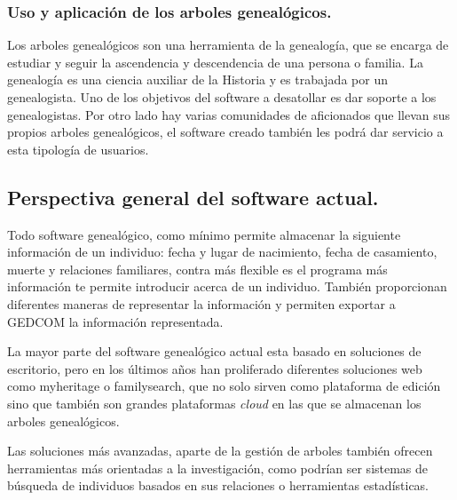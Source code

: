\documentclass[12pt]{article} %
\begin{document}
\subsubsection{Uso y aplicación de los arboles genealógicos.}
Los arboles genealógicos son una herramienta de la genealogía, que se encarga de estudiar y seguir la ascendencia y descendencia de una persona o familia. La genealogía es una ciencia auxiliar de la Historia y es trabajada por un genealogista. Uno de los objetivos del software a desatollar es dar soporte a los genealogistas. \linebreak Por otro lado hay varias comunidades de aficionados que llevan sus propios arboles genealógicos, el software creado también les podrá dar servicio a esta tipología de usuarios.

\newpage
\subsection{Perspectiva general del software actual.}
Todo software genealógico, como mínimo permite almacenar la siguiente información de un individuo: fecha y lugar de nacimiento, fecha de casamiento, muerte y relaciones familiares, contra más flexible es el programa más información te permite introducir acerca de un individuo. También proporcionan diferentes maneras de representar la información y permiten exportar a GEDCOM la información representada.

\noindent{}

La mayor parte del software genealógico actual esta basado en soluciones de escritorio, pero en los últimos años han proliferado diferentes soluciones web como myheritage o familysearch, que no solo sirven como plataforma de edición sino que también son grandes plataformas \textit{cloud} en las que se almacenan los arboles genealógicos.

Las soluciones más avanzadas, aparte de la gestión de arboles también ofrecen herramientas más orientadas a la investigación, como podrían ser sistemas de búsqueda de individuos basados en sus relaciones o herramientas estadísticas.
\end{document}
